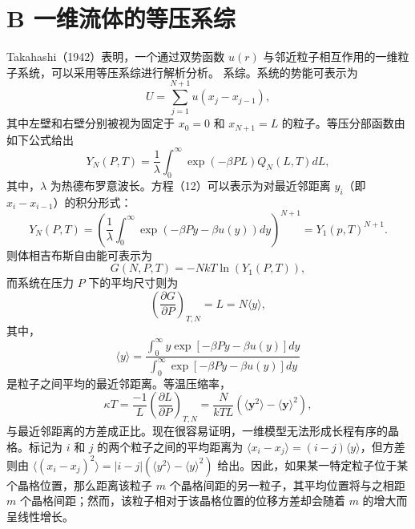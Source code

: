 \section{B 一维流体的等压系综}\label{b-ux4e00ux7ef4ux6d41ux4f53ux7684ux7b49ux538bux7cfbux7efc}
Takahashi（1942）表明，一个通过双势函数 \(u(r)\) 与邻近粒子相互作用的一维粒子系统，可以采用等压系综进行解析分析。
系综。系统的势能可表示为
\begin{equation}\tag{13.1.9}\label{eq:13.1.9}
U = \sum _ { j = 1 } ^{N + 1} u ( x _ { j } - x _ { j - 1 } ) ,
\end{equation}
其中左壁和右壁分别被视为固定于 \(x_{0}=0\) 和 \(x_{N+1}=L\) 的粒子。等压分部函数由如下公式给出
\begin{equation}\tag{13.1.10}\label{eq:13.1.10}
Y _ { N } ( P , T ) = \frac { 1 } { \lambda } \int _ { 0 } ^{\infty} \exp ( - \beta P L ) Q _ { N } ( L , T ) d L ,
\end{equation}
其中，\(\lambda\) 为热德布罗意波长。方程（12）可以表示为对最近邻距离 \(y_i\)（即 \(x_i - x_{i-1}\)）的积分形式：
\begin{equation}\tag{13.1.11}\label{eq:13.1.11}
Y _ { N } ( P , T ) = \left( \frac { 1 } { \lambda } \int _ { 0 } ^{\infty} \exp ( - \beta P y - \beta u ( y ) ) d y \right) ^{N + 1} = Y _ { 1 } ( p , T ) ^{N + 1} .
\end{equation}
则体相吉布斯自由能可表示为
\begin{equation}\tag{13.1.12}\label{eq:13.1.12}
G ( N , P , T ) = - N k T \ln ( Y _ { 1 } ( P , T ) ) ,
\end{equation}
而系统在压力 \(P\) 下的平均尺寸则为
\begin{equation}\tag{13.1.13}\label{eq:13.1.13}
\left( \frac { \partial G } { \partial P } \right) _ { T , N } = L = N \langle y \rangle ,
\end{equation}
其中，
\begin{equation}\tag{13.1.14}\label{eq:13.1.14}
\langle y \rangle = \frac { \int _ { 0 } ^{\infty} y \exp [ - \beta P y - \beta u ( y ) ] d y } { \int _ { 0 } ^{\infty} \exp [ - \beta P y - \beta u ( y ) ] d y }
\end{equation}
是粒子之间平均的最近邻距离。等温压缩率，
\begin{equation}\tag{13.1.15}\label{eq:13.1.15}
\kappa T = \frac { - 1 } { L } \left( \frac { \partial L } { \partial P } \right) _ { T , N } = \frac { N } { k T L } \left( \langle \mathbf { y } ^{2} \rangle - \langle \mathbf { y } \rangle ^{2} \right) ,
\end{equation}
与最近邻距离的方差成正比。现在很容易证明，一维模型无法形成长程有序的晶格。标记为 \(i\) 和 \(j\) 的两个粒子之间的平均距离为 \(\langle x_i - x_j \rangle = (i - j)\langle y \rangle\)，但方差则由 \(\langle (x_i - x_j)^2 \rangle = |i - j|(\langle y^2 \rangle - \langle y \rangle^2)\) 给出。因此，如果某一特定粒子位于某个晶格位置，那么距离该粒子 \(m\) 个晶格间距的另一粒子，其平均位置将与之相距 \(m\) 个晶格间距；然而，该粒子相对于该晶格位置的位移方差却会随着 \(m\) 的增大而呈线性增长。
